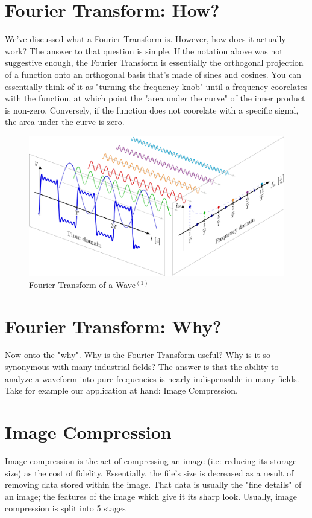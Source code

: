 \documentclass{article}
\begin{document}
\section*{Fourier Transform: How?}
We've discussed what a Fourier Transform is. However, how does it actually work?
\newline \newline
The answer to that question is simple. If the notation above was not suggestive enough, the Fourier Transform
is essentially the orthogonal projection of a function onto an orthogonal basis that's made of sines and cosines. 
You can essentially think of it as "turning the frequency knob" until a frequency coorelates with the function, 
at which point the "area under the curve" of the inner product is non-zero. Conversely, if the function does not
coorelate with a specific signal, the area under the curve is zero.

\begin{figure}[h]
    \centering
    \includegraphics[width=0.5\linewidth]{Images/fourier_decomposition.png}
    \caption{Fourier Transform of a Wave$^{(1)}$}
    \label{fig:enter-label}
\end{figure}

\section*{Fourier Transform: Why?}
Now onto the "why". Why is the Fourier Transform useful? Why is it so synonymous with many industrial fields?
The answer is that the ability to analyze a waveform into pure frequencies is nearly indispensable in many fields.
\newline \newline
Take for example our application at hand: Image Compression.

\section*{Image Compression}
Image compression is the act of compressing an image (i.e: reducing its storage size) as the cost of fidelity.
Essentially, the file's size is decreased as a result of removing data stored within the image. That data is usually
the "fine details" of an image; the features of the image which give it its sharp look. Usually, image compression is split
into 5 stages
\end{document}

